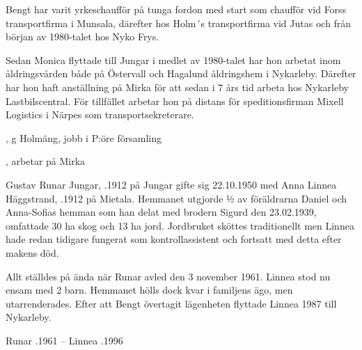 
Bengt har varit yrkeschaufför på tunga fordon med start som chaufför vid Forss transportfirma i Munsala, därefter hos Holm´s transportfirma vid Jutas och från början av 1980-talet hos Nyko Frys.

Sedan Monica flyttade till Jungar i medlet av 1980-talet har hon arbetat inom åldringsvården både på Östervall och Hagalund åldringshem i Nykarleby. Därefter har hon haft anställning på Mirka för att sedan i 7 års tid arbeta hos Nykarleby Lastbilscentral. För tillfället arbetar hon på distans för speditionsfirman Mixell Logistics i Närpes som transportsekreterare.
\begin{jhchildren}
  \item {}, g Holmäng, jobb i P:öre församling
  \item {}, arbetar på Mirka
\end{jhchildren}


Gustav Runar Jungar, .1912 på Jungar gifte sig 22.10.1950 med Anna Linnea Häggstrand, .1912 på Mietala. Hemmanet utgjorde ½ av föräldrarna Daniel och Anna-Sofias hemman som han delat med brodern Sigurd den 23.02.1939, omfattade 30 ha skog och 13 ha jord. Jordbruket sköttes traditionellt men Linnea hade redan tidigare fungerat som kontrollassistent och fortsatt med detta efter makens död.

Allt ställdes på ända när Runar avled den 3 november 1961. Linnea stod nu ensam med 2 barn. Hemmanet hölls dock kvar i familjens ägo, men utarrenderades. Efter att Bengt övertagit lägenheten flyttade Linnea 1987 till Nykarleby.
\begin{jhchildren}
  \item {}
  \item {}
\end{jhchildren}
Runar .1961  --  Linnea .1996


